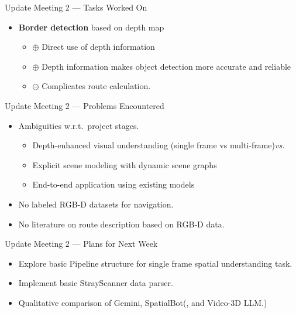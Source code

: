 \documentclass[aspectratio=169,xcolor=dvipsnames]{beamer}
\newcommand{\framedate}[1]{\def\currentframedate{#1}}
\begin{document}
\framedate{01.04.2025}
\begin{frame}{Update Meeting 2 --- Tasks Worked On}
  \begin{itemize}
  \item \textbf{Border detection} based on depth map
  \begin{itemize}
    \item \( \oplus \) Direct use of depth information
    \item \( \oplus \) Depth information makes object detection more accurate and reliable
    \item \( \ominus \) Complicates route calculation.
  \end{itemize}
\end{itemize}

\end{frame}


\framedate{01.04.2025}
\begin{frame}{Update Meeting 2 --- Problems Encountered}
\begin{itemize}
  \item Ambiguities w.r.t.\ project stages.
  \begin{itemize}
    \item Depth-enhanced visual understanding (single frame vs multi-frame){\it vs.}
    \item Explicit scene modeling with dynamic scene graphs
    \item End-to-end application using existing models
  \end{itemize}
  \item No labeled RGB-D datasets for navigation.
  \item No literature on route description based on RGB-D data.
\end{itemize}
\end{frame}

\framedate{01.04.2025}
\begin{frame}{Update Meeting 2 --- Plans for Next Week}
  \begin{itemize}
    \item Explore basic Pipeline structure for single frame spatial understanding task.
    \item Implement basic StrayScanner data parser.
    \item Qualitative comparison of Gemini, SpatialBot(, and Video-3D LLM.)
\end{itemize}
\end{frame}
\end{document}
